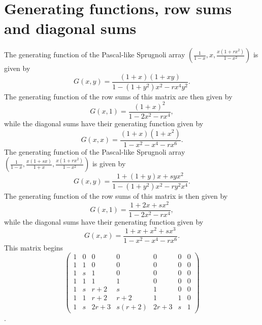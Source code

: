 \documentclass[12pt,reqno]{article}
\theoremstyle{definition}
\begin{document}
\section{Generating functions, row sums and diagonal sums}
The generating function of the Pascal-like Sprugnoli array $\left(\frac{1}{1-x}, x, \frac{x(1+rx^2)}{1-x^2}\right)$ is given by
$$G(x,y)=\frac{(1+x)(1+xy)}{1-(1+y^2)x^2-rx^4y^2}.$$
The generating function of the row sums of this matrix are then given by
$$G(x,1)=\frac{(1+x)^2}{1-2x^2-rx^4},$$ while the diagonal sums have their generating function given by
$$G(x,x)=\frac{(1+x)(1+x^2)}{1-x^2-x^4-rx^6}.$$
The generating function of the Pascal-like Sprugnoli array $\left(\frac{1}{1-x}, \frac{x(1+sx)}{1+x}, \frac{x(1+rx^2)}{1-x^2}\right)$ is given by
$$G(x,y)=\frac{1+(1+y)x+syx^2}{1-(1+y^2)x^2-ry^2x^4}.$$
The generating function of the row sums of this matrix is then given by
$$G(x,1)=\frac{1+2x+sx^2}{1-2x^2-rx^4},$$ while the diagonal sums have their generating function given by
$$G(x,x)=\frac{1+x+x^2+sx^3}{1-x^2-x^4-rx^6}.$$
This matrix begins 
\[
\begin{pmatrix}
1 & 0 & 0 & 0 & 0 & 0 & 0 \\
1 & 1 & 0 & 0 & 0 & 0 & 0 \\
1 & s & 1 & 0 & 0 & 0 & 0 \\
1 & 1 & 1 & 1 & 0 & 0 & 0 \\
1 & s & r+2 & s & 1 & 0 & 0 \\
1 & 1 & r+2 & r+2 & 1 & 1 & 0 \\
1 & s & 2r+3 & s(r+2) & 2r+3 & s & 1
\end{pmatrix}
\].
\end{document}
